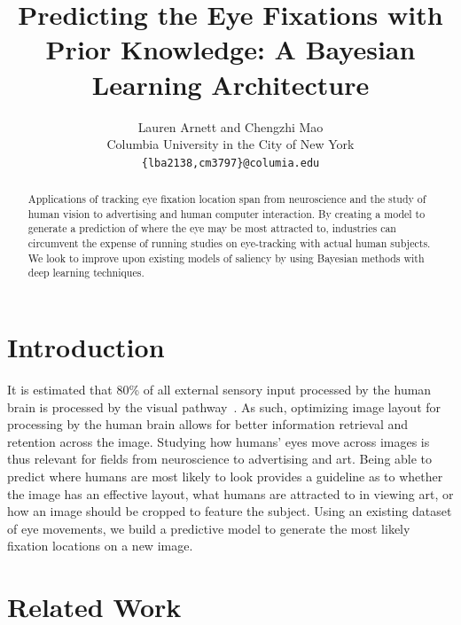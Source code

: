 \documentclass[10pt,twocolumn,letterpaper]{article}
\begin{document}
\title{Predicting the Eye Fixations with Prior Knowledge: A Bayesian Learning Architecture}

\author{Lauren Arnett and Chengzhi Mao\\
Columbia University in the City of New York\\
    {\tt\small \{lba2138,cm3797\}@columia.edu}
}

\maketitle

\begin{abstract} 
    
    Applications of tracking eye fixation location span from neuroscience and
    the study of human vision to advertising and human computer interaction. By
    creating a model to generate a prediction of where the eye may be most
    attracted to, industries can circumvent the expense of running studies on
    eye-tracking with actual human subjects. We look to improve upon existing
    models of saliency by using Bayesian methods with deep learning techniques.

\end{abstract}

\section{Introduction} It is estimated that 80\% of all external sensory input
processed by the human brain is processed by the visual pathway~\cite{Jerath}.
As such, optimizing image layout for processing by the human brain allows for
better information retrieval and retention across the image. Studying how
humans’ eyes move across images is thus relevant for fields from neuroscience
to advertising and  art. Being able to predict where humans are most likely to
look provides a guideline as to whether the image has an effective layout, what
humans are attracted to in viewing art, or how an image should be cropped to
feature the subject. Using an existing dataset of eye movements, we build
a predictive model to generate the most likely fixation locations on a new
image.
\section{Related Work} 
\end{document}
